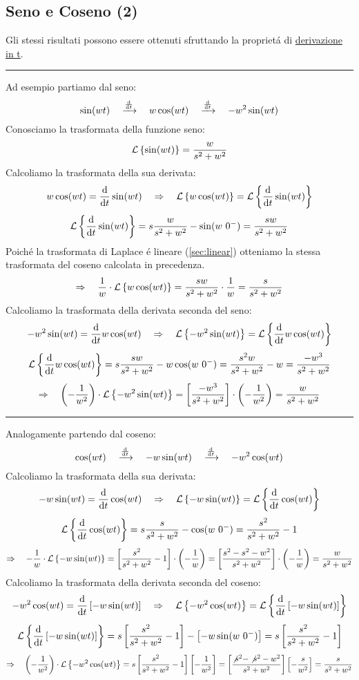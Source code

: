 \documentclass[../main.tex]{subfiles}
\begin{document}
	\subsection{Seno e Coseno (2)}
		Gli stessi risultati possono essere ottenuti sfruttando la propriet\'{a} di \hyperref[sec:deriv_t]{derivazione in t}.\\
		\rule{\linewidth}{0.4pt}
		Ad esempio partiamo dal seno:
		\[
			\sin(wt) \quad \xrightarrow{\frac{\mathrm{d} }{\mathrm{d} t}} \quad w \cos(wt) \quad \xrightarrow{\frac{\mathrm{d} }{\mathrm{d} t}} \quad -w^2 \sin(wt)
		\]
		Conosciamo la trasformata della funzione seno:
		\[
			\mathcal{L} \left\lbrace \sin(wt) \right\rbrace = \frac{w}{s^2+w^2}
		\]
		Calcoliamo la trasformata della sua derivata:
		\[
			w \cos(wt) = \frac{\mathrm{d} }{\mathrm{d} t} \sin(wt) \quad\Rightarrow\quad \mathcal{L} \left\lbrace w \cos(wt) \right\rbrace = \mathcal{L} \left\lbrace \frac{\mathrm{d} }{\mathrm{d} t} \sin(wt) \right\rbrace
		\]
		\[
			\mathcal{L} \left\lbrace \frac{\mathrm{d} }{\mathrm{d} t} \sin(wt) \right\rbrace = s \frac{w}{s^2+w^2} - \sin(w\ 0^-) = \frac{sw}{s^2+w^2}
		\]
		Poich\'{e} la trasformata di Laplace \'{e} lineare (\ref{sec:linear}) otteniamo la stessa trasformata del coseno calcolata in precedenza.
		\[
			\Rightarrow \quad \frac{1}{w} \cdot \mathcal{L} \left\lbrace w\cos(wt) \right\rbrace = \frac{sw}{s^2+w^2} \cdot \frac{1}{w} = \frac{s}{s^2+w^2}
		\]
		Calcoliamo la trasformata della derivata seconda del seno:
		\[
			-w^2 \sin(wt) = \frac{\mathrm{d} }{\mathrm{d} t} w\cos(wt) \quad\Rightarrow\quad \mathcal{L} \left\lbrace -w^2 \sin(wt) \right\rbrace = \mathcal{L} \left\lbrace \frac{\mathrm{d} }{\mathrm{d} t} w\cos(wt) \right\rbrace
		\]
		\[
			\mathcal{L} \left\lbrace \frac{\mathrm{d} }{\mathrm{d} t} w\cos(wt) \right\rbrace = s \frac{sw}{s^2+w^2} - w\cos(w\ 0^-) = \frac{s^2w}{s^2+w^2} - w = \frac{-w^3}{s^2+w^2}
		\]
		\[
			\Rightarrow \quad \left( - \frac{1}{w^2} \right) \cdot \mathcal{L} \left\lbrace -w^2 \sin(wt) \right\rbrace = \left[ \frac{-w^3}{s^2+w^2} \right] \cdot \left( - \frac{1}{w^2} \right) = \frac{w}{s^2+w^2}
		\]
		\rule{\linewidth}{0.4pt}
		Analogamente partendo dal coseno:
		\[
			\cos(wt) \quad \xrightarrow{\frac{\mathrm{d} }{\mathrm{d} t}} \quad -w\sin(wt) \quad \xrightarrow{\frac{\mathrm{d} }{\mathrm{d} t}} \quad -w^2\cos(wt)
		\]
		Calcoliamo la trasformata della sua derivata:
		\[
			-w\sin(wt) = \frac{\mathrm{d} }{\mathrm{d} t} \cos(wt) \quad\Rightarrow\quad \mathcal{L} \left\lbrace -w\sin(wt) \right\rbrace = \mathcal{L} \left\lbrace \frac{\mathrm{d} }{\mathrm{d} t} \cos(wt) \right\rbrace
		\]
		\[
			\mathcal{L} \left\lbrace \frac{\mathrm{d} }{\mathrm{d} t} \cos(wt) \right\rbrace = s \frac{s}{s^2+w^2} - \cos(w\ 0^-) = \frac{s^2}{s^2+w^2} - 1
		\]
		\[
			\Rightarrow \quad -\frac{1}{w} \cdot \mathcal{L} \left\lbrace -w\sin(wt) \right\rbrace = \left[ \frac{s^2}{s^2+w^2} - 1 \right] \cdot \left( -\frac{1}{w}\right) = \left[ \frac{s^2-s^2-w^2}{s^2+w^2} \right] \cdot \left( -\frac{1}{w}\right) = \frac{w}{s^2+w^2}
		\]
		Calcoliamo la trasformata della derivata seconda del coseno:
		\[
			-w^2 \cos(wt) = \frac{\mathrm{d} }{\mathrm{d} t} \left[ -w\sin(wt) \right] \quad\Rightarrow\quad \mathcal{L} \left\lbrace -w^2 \cos(wt) \right\rbrace = \mathcal{L} \left\lbrace \frac{\mathrm{d} }{\mathrm{d} t} \left[ -w\sin(wt) \right] \right\rbrace
		\]
		\[
			\mathcal{L} \left\lbrace \frac{\mathrm{d} }{\mathrm{d} t} \left[ -w\sin(wt) \right] \right\rbrace = s \left[ \frac{s^2}{s^2+w^2} - 1 \right] - \left[ -w\sin(w\ 0^-) \right] = s \left[ \frac{s^2}{s^2+w^2} - 1 \right]
		\]
		\[
			\Rightarrow \quad \left( - \frac{1}{w^2} \right) \cdot \mathcal{L} \left\lbrace -w^2 \cos(wt) \right\rbrace = s \left[ \frac{s^2}{s^2+w^2} - 1 \right] \left[ - \frac{1}{w^2} \right] = \left[ \frac{\not{s^2}-\not{s^2}-w^2}{s^2+w^2} \right] \left[ -\frac{s}{w^2} \right] = \frac{s}{s^2+w^2}
		\]
\end{document}

